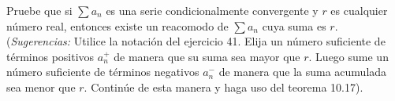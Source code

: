 \item Pruebe que si $\sum a_n$ es una serie condicionalmente convergente y $r$ es cualquier número real, entonces existe un reacomodo de $\sum a_n$ cuya suma es $r$. (\textit{Sugerencias:} Utilice la notación del ejercicio 41. Elija un número suficiente de términos positivos $a_n^+$ de manera que su suma sea mayor que $r$. Luego sume un número suficiente de términos negativos $a_n^-$ de manera que la suma acumulada sea menor que $r$. Continúe de esta manera y haga uso del teorema 10.17).
